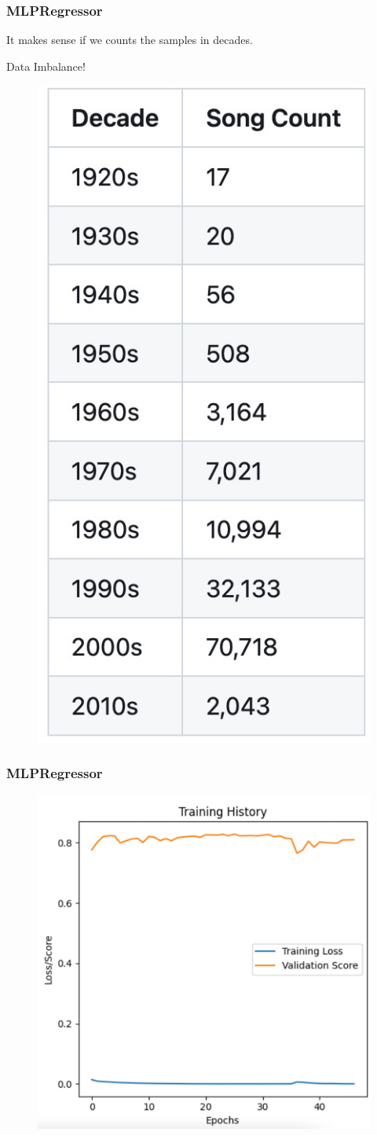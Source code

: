 \documentclass{beamer}
\begin{document}
\begin{frame}[fragile]
    \frametitle{{MLPRegressor}}
    \begin{center}
        It makes sense if we counts the samples in decades.

        Data Imbalance!
    \end{center}
\begin{figure}
    \centering
    \includegraphics[width=0.3\linewidth]{img/decades.jpg}
\end{figure}
\end{frame}

\begin{frame}[fragile]
    \frametitle{{MLPRegressor}}
\begin{figure}
    \centering
    \includegraphics[width=0.7\linewidth]{img/trainHistory.jpg}
\end{figure}
\end{frame}
\end{document}
